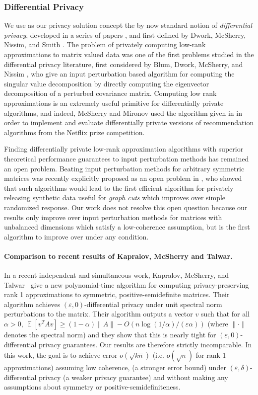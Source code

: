 \documentclass[letterpaper,11pt]{article}
\theoremstyle{definition}
\newcommand{\Esymb}{\mathbb{E}}
\DeclareMathOperator*{\E}{\Esymb}
\renewcommand{\geq}{\geqslant}
\renewcommand{\epsilon}{\varepsilon}
\begin{document}
\subsubsection{Differential Privacy}
We use as our privacy solution concept the by now standard notion of
\emph{differential privacy}, developed in a series of papers \cite{BlumDMN05,
ChawlaDMSW05,DworkMNS06}, and first defined by Dwork, McSherry, Nissim, and Smith
\cite{DworkMNS06}. The problem of privately computing low-rank approximations to
matrix valued data was one of the first problems studied in the differential
privacy literature, first considered by Blum, Dwork, McSherry, and Nissim
\cite{BlumDMN05}, who give an input perturbation based algorithm for computing
the singular value decomposition by directly computing the eigenvector
decomposition of a perturbed covariance matrix. Computing low rank
approximations is an extremely useful primitive for differentially private
algorithms, and indeed, McSherry and Mironov \cite{McSherryM09} used the algorithm
given in \cite{BlumDMN05} in order to implement and evaluate differentially
private versions of recommendation algorithms from the Netflix prize
competition.

Finding differentially private low-rank approximation algorithms with superior
theoretical performance guarantees to input perturbation methods has remained
an open problem. Beating input perturbation methods for arbitrary symmetric
matrices was recently explicitly proposed as an open problem in
\cite{GuptaRU11}, who showed that such algorithms would lead to the first
efficient algorithm for privately releasing synthetic data useful for
\emph{graph cuts} which improves over simple randomized response. Our work
does not resolve this open question because our results only improve over
input perturbation methods for matrices with unbalanced dimensions which
satisfy a low-coherence assumption, but is the first algorithm to improve over
\cite{BlumDMN05} under any condition.

\paragraph{Comparison to recent results of Kapralov, McSherry and Talwar.}

In a recent independent and simultaneous work, Kapralov, McSherry, and
Talwar~\cite{KapralovMT11} give a new polynomial-time algorithm for computing
privacy-preserving rank 1 approximations to symmetric, positive-semidefinite matrices. Their algorithm achieves
$(\epsilon,0)$-differential privacy under unit spectral norm perturbations to
the matrix. Their algorithm outputs a vector $v$ such that for all $\alpha > 0$, $\E[v^TAv] \geq (1-\alpha)\|A\| - O(n\log(1/\alpha)/(\epsilon\alpha))$ (where $\|\cdot\|$ denotes the spectral norm) and they show that this is nearly tight for $(\epsilon,0)$-differential privacy guarantees. Our results are therefore
strictly incomparable. In this work, the goal is to achieve error
$o(\sqrt{kn})$ (i.e. $o(\sqrt{n})$ for rank-1 approximations) assuming low coherence, (a stronger error bound) under
$(\epsilon,\delta)$-differential privacy (a weaker privacy guarantee) and without making any assumptions about symmetry or positive-semidefiniteness.
\end{document}
